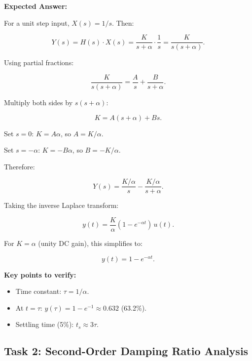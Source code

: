 \documentclass[11pt,letterpaper]{article}
\begin{document}
\noindent
\textbf{Expected Answer:}

For a unit step input, $X(s) = 1/s$. Then:

\begin{equation}
Y(s) = H(s) \cdot X(s) = \frac{K}{s+\alpha} \cdot \frac{1}{s} = \frac{K}{s(s+\alpha)}.
\end{equation}

Using partial fractions:

\begin{equation}
\frac{K}{s(s+\alpha)} = \frac{A}{s} + \frac{B}{s+\alpha}.
\end{equation}

Multiply both sides by $s(s+\alpha)$:

\begin{equation}
K = A(s+\alpha) + Bs.
\end{equation}

Set $s = 0$: $K = A\alpha$, so $A = K/\alpha$.

Set $s = -\alpha$: $K = -B\alpha$, so $B = -K/\alpha$.

Therefore:

\begin{equation}
Y(s) = \frac{K/\alpha}{s} - \frac{K/\alpha}{s+\alpha}.
\end{equation}

Taking the inverse Laplace transform:

\begin{equation}
y(t) = \frac{K}{\alpha}(1 - e^{-\alpha t}) \, u(t).
\end{equation}

For $K = \alpha$ (unity DC gain), this simplifies to:

\begin{equation}
y(t) = 1 - e^{-\alpha t}.
\end{equation}

\textbf{Key points to verify:}
\begin{itemize}
    \item Time constant: $\tau = 1/\alpha$.
    \item At $t = \tau$: $y(\tau) = 1 - e^{-1} \approx 0.632$ (63.2\%).
    \item Settling time (5\%): $t_s \approx 3\tau$.
\end{itemize}

\subsection{Task 2: Second-Order Damping Ratio Analysis}
\end{document}
